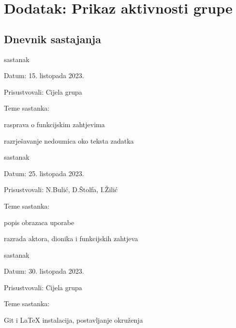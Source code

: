 \chapter*{Dodatak: Prikaz aktivnosti grupe}
		
		\section*{Dnevnik sastajanja}
		
		\begin{packed_enum}
			\item  sastanak
			
			\item[] \begin{packed_item}
				\item Datum: 15. listopada 2023.
				\item Prisustvovali: Cijela grupa
				\item Teme sastanka:
				\begin{packed_item}
					\item  rasprava o funkcijskim zahtjevima
					\item  razrješavanje nedoumica oko teksta zadatka
				\end{packed_item}
			\end{packed_item}
			
			\item  sastanak
			\item[] \begin{packed_item}
				\item Datum: 25. listopada 2023.
				\item Prisustvovali: N.Bulić, D.Štolfa, I.Žilić
				\item Teme sastanka:
				\begin{packed_item}
					\item  popis obrazaca uporabe
					\item  razrada aktora, dionika i funkcijskih zahtjeva
				\end{packed_item}
			\end{packed_item}

			\item  sastanak
			\item[] \begin{packed_item}
				\item Datum: 30. listopada 2023.
				\item Prisustvovali: Cijela grupa
				\item Teme sastanka:
				\begin{packed_item}
					\item  Git i LaTeX instalacija, postavljanje okruženja
				\end{packed_item}
			\end{packed_item}


\end{packed_enum}
